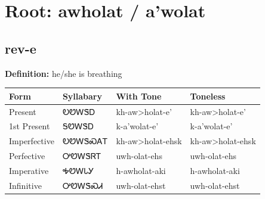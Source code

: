 \documentclass{article}%
\begin{document}
%
\normalsize%
\section*{Root: awholat / a'wolat}%
\subsection*{rev-e}%
\textbf{Definition: }%
he/she is breathing%
\\[0.5em]%
\begin{tabular}{|l|l|l|l|}%
\hline%
\textbf{Form}&\textbf{Syllabary}&\textbf{With Tone}&\textbf{Toneless}\\%
\hline%
Present&ᎧᏬᎳᏕᎠ&kh{-}aw>holat{-}e'&kh{-}aw>holat{-}e'\\%
1st Present&ᎦᏬᎳᏕᎠ&k{-}a'wolat{-}e'&k{-}a'wolat{-}e'\\%
Imperfective&ᎧᏬᎳᏕᏍᎪᎢ&kh{-}aw>holat{-}ehsk&kh{-}aw>holat{-}ehsk\\%
Perfective&ᎤᏬᎳᏕᏒᎢ&uwh{-}olat{-}ehs&uwh{-}olat{-}ehs\\%
Imperative&ᎭᏬᎳᏓᎩ&h{-}awholat{-}aki&h{-}awholat{-}aki\\%
Infinitive&ᎤᏬᎳᏕᏍᏗ&uwh{-}olat{-}ehst&uwh{-}olat{-}ehst\\%
\hline%
\end{tabular}%
\\[1em]%
\end{document}
